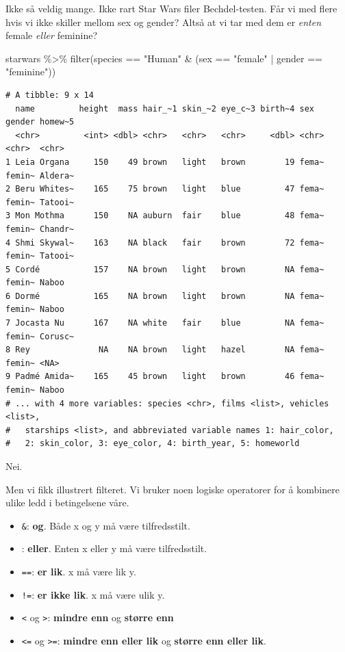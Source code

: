 \documentclass[
  letterpaper,
  DIV=11,
  numbers=noendperiod]{scrreprt}
\newenvironment{Shaded}{\begin{snugshade}}{\end{snugshade}}
\newcommand{\FunctionTok}[1]{\textcolor[rgb]{0.28,0.35,0.67}{#1}}
\newcommand{\NormalTok}[1]{\textcolor[rgb]{0.00,0.23,0.31}{#1}}
\newcommand{\SpecialCharTok}[1]{\textcolor[rgb]{0.37,0.37,0.37}{#1}}
\newcommand{\StringTok}[1]{\textcolor[rgb]{0.13,0.47,0.30}{#1}}
\providecommand{\tightlist}{%
  \setlength{\itemsep}{0pt}\setlength{\parskip}{0pt}}\usepackage{longtable,booktabs,array}
\begin{document}
Ikke så veldig mange. Ikke rart Star Wars filer Bechdel-testen. Får vi
med flere hvis vi ikke skiller mellom sex og gender? Altså at vi tar med
dem er \emph{enten} female \emph{eller} feminine?

\begin{Shaded}
\begin{Highlighting}[]
\NormalTok{starwars }\SpecialCharTok{\%\textgreater{}\%} \FunctionTok{filter}\NormalTok{(species }\SpecialCharTok{==} \StringTok{"Human"} \SpecialCharTok{\&}\NormalTok{ (sex }\SpecialCharTok{==} \StringTok{"female"} \SpecialCharTok{|}\NormalTok{ gender }\SpecialCharTok{==} \StringTok{"feminine"}\NormalTok{))}
\end{Highlighting}
\end{Shaded}

\begin{verbatim}
# A tibble: 9 x 14
  name         height  mass hair_~1 skin_~2 eye_c~3 birth~4 sex   gender homew~5
  <chr>         <int> <dbl> <chr>   <chr>   <chr>     <dbl> <chr> <chr>  <chr>  
1 Leia Organa     150    49 brown   light   brown        19 fema~ femin~ Aldera~
2 Beru Whites~    165    75 brown   light   blue         47 fema~ femin~ Tatooi~
3 Mon Mothma      150    NA auburn  fair    blue         48 fema~ femin~ Chandr~
4 Shmi Skywal~    163    NA black   fair    brown        72 fema~ femin~ Tatooi~
5 Cordé           157    NA brown   light   brown        NA fema~ femin~ Naboo  
6 Dormé           165    NA brown   light   brown        NA fema~ femin~ Naboo  
7 Jocasta Nu      167    NA white   fair    blue         NA fema~ femin~ Corusc~
8 Rey              NA    NA brown   light   hazel        NA fema~ femin~ <NA>   
9 Padmé Amida~    165    45 brown   light   brown        46 fema~ femin~ Naboo  
# ... with 4 more variables: species <chr>, films <list>, vehicles <list>,
#   starships <list>, and abbreviated variable names 1: hair_color,
#   2: skin_color, 3: eye_color, 4: birth_year, 5: homeworld
\end{verbatim}

Nei.

Men vi fikk illustrert filteret. Vi bruker noen logiske operatorer for å
kombinere ulike ledd i betingelsene våre.

\begin{itemize}
\tightlist
\item
  \texttt{\&}: \textbf{og}. Både x og y må være tilfredsstilt.
\item
  \texttt{\textbar{}}: \textbf{eller}. Enten x eller y må være
  tilfredsstilt.
\item
  \texttt{==}: \textbf{er lik}. x må være lik y.
\item
  \texttt{!=}: \textbf{er ikke lik}. x må være ulik y.
\item
  \texttt{\textless{}} og \texttt{\textgreater{}}: \textbf{mindre enn}
  og \textbf{større enn}
\item
  \texttt{\textless{}=} og \texttt{\textgreater{}=}: \textbf{mindre enn
  eller lik} og \textbf{større enn eller lik}.
\end{itemize}
\end{document}
